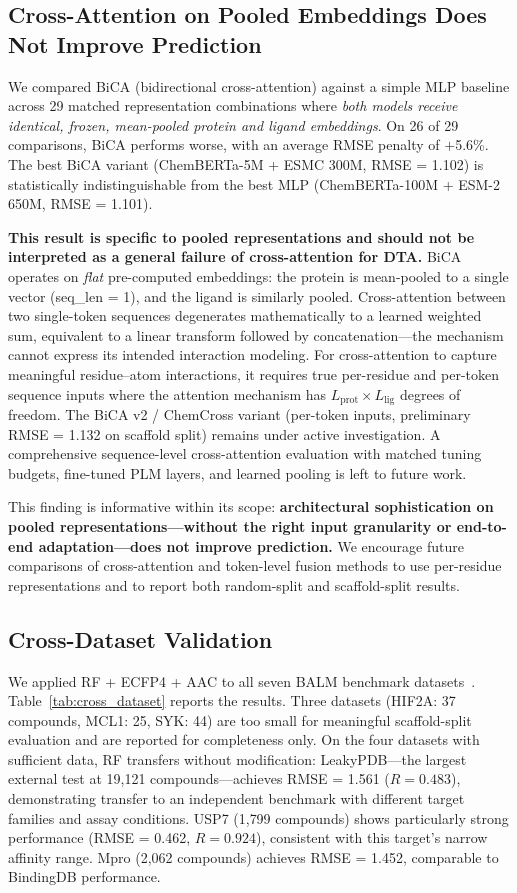 \documentclass[11pt,twocolumn,a4paper]{article}
\begin{document}
\subsection{Cross-Attention on Pooled Embeddings Does Not Improve Prediction}
\label{sec:chemcross}

We compared BiCA (bidirectional cross-attention) against a simple MLP baseline across 29 matched representation combinations where \emph{both models receive identical, frozen, mean-pooled protein and ligand embeddings}. On 26 of 29 comparisons, BiCA performs worse, with an average RMSE penalty of $+$5.6\%. The best BiCA variant (ChemBERTa-5M + ESMC 300M, RMSE = 1.102) is statistically indistinguishable from the best MLP (ChemBERTa-100M + ESM-2 650M, RMSE = 1.101).

\textbf{This result is specific to pooled representations and should not be interpreted as a general failure of cross-attention for DTA.} BiCA operates on \emph{flat} pre-computed embeddings: the protein is mean-pooled to a single vector (seq\_len = 1), and the ligand is similarly pooled. Cross-attention between two single-token sequences degenerates mathematically to a learned weighted sum, equivalent to a linear transform followed by concatenation---the mechanism cannot express its intended interaction modeling. For cross-attention to capture meaningful residue--atom interactions, it requires true per-residue and per-token sequence inputs where the attention mechanism has $L_\text{prot} \times L_\text{lig}$ degrees of freedom. The BiCA v2 / ChemCross variant (per-token inputs, preliminary RMSE = 1.132 on scaffold split) remains under active investigation. A comprehensive sequence-level cross-attention evaluation with matched tuning budgets, fine-tuned PLM layers, and learned pooling is left to future work.

This finding is informative within its scope: \textbf{architectural sophistication on pooled representations---without the right input granularity or end-to-end adaptation---does not improve prediction.} We encourage future comparisons of cross-attention and token-level fusion methods to use per-residue representations and to report both random-split and scaffold-split results.

\subsection{Cross-Dataset Validation}
\label{sec:cross_dataset}

We applied RF + ECFP4 + AAC to all seven BALM benchmark datasets~\cite{balm2024}. Table~\ref{tab:cross_dataset} reports the results. Three datasets (HIF2A: 37 compounds, MCL1: 25, SYK: 44) are too small for meaningful scaffold-split evaluation and are reported for completeness only. On the four datasets with sufficient data, RF transfers without modification: LeakyPDB---the largest external test at 19,121 compounds---achieves RMSE = 1.561 ($R = 0.483$), demonstrating transfer to an independent benchmark with different target families and assay conditions. USP7 (1,799 compounds) shows particularly strong performance (RMSE = 0.462, $R = 0.924$), consistent with this target's narrow affinity range. Mpro (2,062 compounds) achieves RMSE = 1.452, comparable to BindingDB performance.
\end{document}
